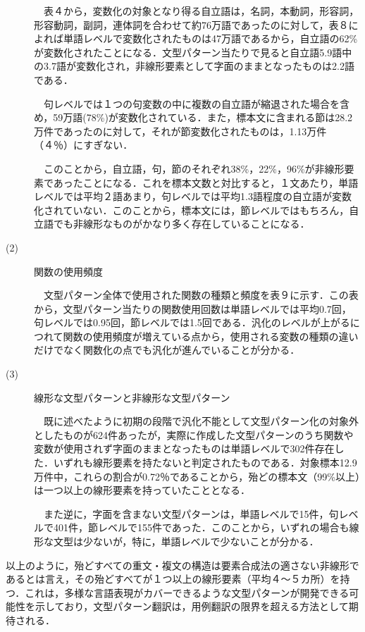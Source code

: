 \documentclass{nlp}
\begin{document}
\begin{description}
　表４から，変数化の対象となり得る自立語は，名詞，本動詞，形容詞，形容動詞，副詞，連体詞を合わせて約76万語であったのに対して，表８によれば単語レベルで変数化されたものは47万語であるから，自立語の62\%が変数化されたことになる．文型パターン当たりで見ると自立語5.9語中の3.7語が変数化され，非線形要素として字面のままとなったものは2.2語である．

　句レベルでは１つの句変数の中に複数の自立語が縮退された場合を含め，59万語(78\%)が変数化されている．また，標本文に含まれる節は28.2万件であったのに対して，それが節変数化されたものは，1.13万件（４％）にすぎない．

　このことから，自立語，句，節のそれぞれ38\%，22\%，96\%が非線形要素であったことになる．これを標本文数と対比すると，１文あたり，単語レベルでは平均２語あまり，句レベルでは平均1.3語程度の自立語が変数化されていない．このことから，標本文には，節レベルではもちろん，自立語でも非線形なものがかなり多く存在していることになる．

\item[(2)]関数の使用頻度

　文型パターン全体で使用された関数の種類と頻度を表９に示す．この表から，文型パターン当たりの関数使用回数は単語レベルでは平均0.7回，句レベルでは0.95回，節レベルでは1.5回である．汎化のレベルが上がるにつれて関数の使用頻度が増えている点から，使用される変数の種類の違いだけでなく関数化の点でも汎化が進んでいることが分かる．

\item[(3)]線形な文型パターンと非線形な文型パターン

　既に述べたように初期の段階で汎化不能として文型パターン化の対象外としたものが624件あったが，実際に作成した文型パターンのうち関数や変数が使用されず字面のままとなったものは単語レベルで302件存在した．いずれも線形要素を持たないと判定されたものである．対象標本12.9万件中，これらの割合が0.72％であることから，殆どの標本文（99\%以上）は一つ以上の線形要素を持っていたこととなる．

　また逆に，字面を含まない文型パターンは，単語レベルで15件，句レベルで401件，節レベルで155件であった．このことから，いずれの場合も線形な文型は少ないが，特に，単語レベルで少ないことが分かる．
\end{description}

以上のように，殆どすべての重文・複文の構造は要素合成法の適さない非線形であるとは言え，その殆どすべてが１つ以上の線形要素（平均４〜５カ所）を持つ．これは，多様な言語表現がカバーできるような文型パターンが開発できる可能性を示しており，文型パターン翻訳は，用例翻訳の限界を超える方法として期待される．
\end{document}
